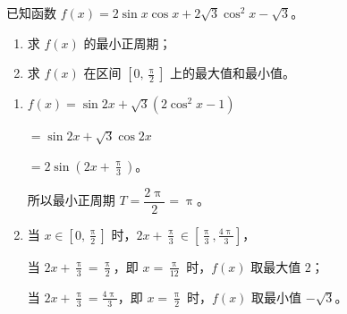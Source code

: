 \documentclass{exam-zh}
\begin{document}
\begin{problem}[points = 12]
  已知函数 $f(x) = 2\sin x \cos x + 2\sqrt{3}\cos^2 x - \sqrt{3}$。

  \begin{enumerate}
    \item 求 $f(x)$ 的最小正周期；
    \item 求 $f(x)$ 在区间 $[0, \frac{\uppi}{2}]$ 上的最大值和最小值。
  \end{enumerate}

  \begin{solution}
    \begin{enumerate}
      \item $f(x) = \sin 2x + \sqrt{3}(2\cos^2 x - 1)$ 

      $= \sin 2x + \sqrt{3}\cos 2x$ 

      $= 2\sin(2x + \frac{\uppi}{3})$。

      所以最小正周期 $T = \dfrac{2\uppi}{2} = \uppi$。

      \item 当 $x \in [0, \frac{\uppi}{2}]$ 时，$2x + \frac{\uppi}{3} \in [\frac{\uppi}{3}, \frac{4\uppi}{3}]$，

      当 $2x + \frac{\uppi}{3} = \frac{\uppi}{2}$，即 $x = \frac{\uppi}{12}$ 时，$f(x)$ 取最大值 $2$；

      当 $2x + \frac{\uppi}{3} = \frac{4\uppi}{3}$，即 $x = \frac{\uppi}{2}$ 时，$f(x)$ 取最小值 $-\sqrt{3}$。
    \end{enumerate}
  \end{solution}
\end{problem}
\end{document}
